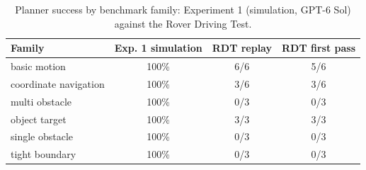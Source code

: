 \begin{table}[htbp]
\centering
\caption{Planner success by benchmark family: Experiment 1 (simulation, GPT-6 Sol) against the Rover Driving Test.}
\label{tab:rdt_family_bridge}
\small
\begin{tabular}{lccc}
\toprule
Family & Exp. 1 simulation & RDT replay & RDT first pass \\
\midrule
basic motion & 100\% & 6/6 & 5/6 \\
coordinate navigation & 100\% & 3/6 & 3/6 \\
multi obstacle & 100\% & 0/3 & 0/3 \\
object target & 100\% & 3/3 & 3/3 \\
single obstacle & 100\% & 0/3 & 0/3 \\
tight boundary & 100\% & 0/3 & 0/3 \\
\bottomrule
\end{tabular}
\end{table}

